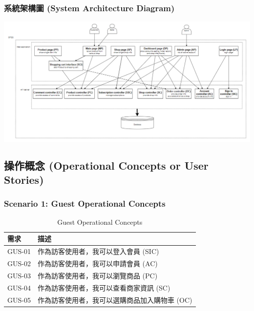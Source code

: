 \documentclass[a4paper, 12pt]{article}
\begin{document}
\subsubsection{系統架構圖 (System Architecture Diagram) }
\begin{center}
\includegraphics[scale=0.6]{image/C4model.png}
\end{center}

\subsection{操作概念 (Operational Concepts or User Stories)}
\subsubsection{Scenario 1: Guest Operational Concepts}
\begin{table}[h]
    \centering
    \renewcommand{\arraystretch}{1.35}
    \begin{tabular}{|p{3cm}|p{10cm}|}
        \hline
        \textbf{需求} & \textbf{描述} \\
        \hline
        GUS-01 & 作為訪客使用者，我可以登入會員 (SIC) \\
        \hline
        GUS-02 & 作為訪客使用者，我可以申請會員 (AC) \\
        \hline
        GUS-03 & 作為訪客使用者，我可以瀏覽商品 (PC) \\
        \hline
        GUS-04 & 作為訪客使用者，我可以查看商家資訊 (SC) \\
        \hline
        GUS-05 & 作為訪客使用者，我可以選購商品加入購物車 (OC) \\
        \hline
    \end{tabular}
    \caption{Guest Operational Concepts}
    \label{tab:guest-operational-concepts}
\end{table}
\newpage
\end{document}
